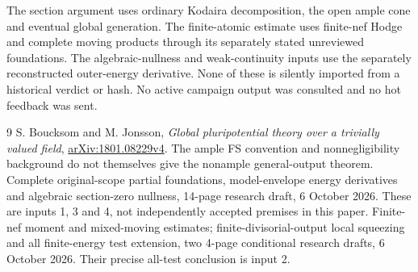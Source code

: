 \documentclass[11pt]{article}
\begin{document}
The section argument uses ordinary Kodaira decomposition, the open
ample cone and eventual global generation. The finite-atomic estimate
uses finite-nef Hodge and complete moving products through its separately
stated unreviewed foundations. The algebraic-nullness and weak-continuity
inputs use the separately reconstructed outer-energy derivative. None
of these is silently imported from a historical verdict or hash.
No active campaign output was consulted and no hot feedback was sent.

\begin{thebibliography}{9}
\small
{} S. Boucksom and M. Jonsson,
\emph{Global pluripotential theory over a trivially valued field},
\href{https://arxiv.org/pdf/1801.08229v4}{arXiv:1801.08229v4}.
The ample FS convention and nonnegligibility background do not themselves
give the nonample general-output theorem.
 Complete original-scope partial foundations,
model-envelope energy derivatives and algebraic section-zero nullness,
14-page research draft, 6 October 2026. These are inputs 1, 3 and 4,
not independently accepted premises in this paper.
 Finite-nef moment and mixed-moving estimates;
finite-divisorial-output local squeezing and all finite-energy test
extension, two 4-page conditional research drafts, 6 October 2026.
Their precise all-test conclusion is input 2.
\end{thebibliography}
\end{document}
